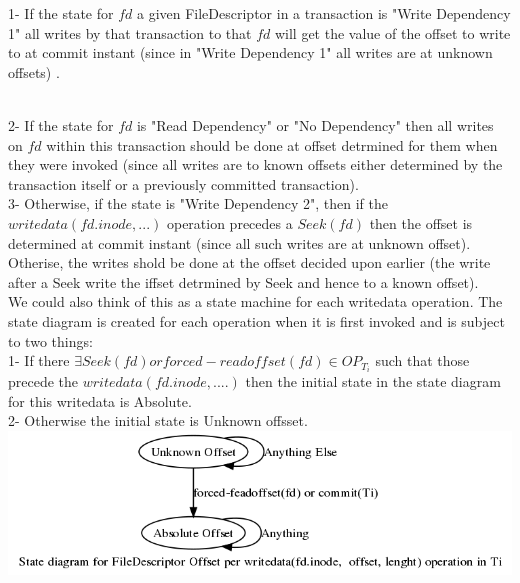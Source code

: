 \documentclass[a4paper, 11pt]{article}
\begin{document}
1- If the state for $fd$ a given FileDescriptor in a transaction is "Write Dependency 1" all writes by that transaction to that $fd$ will get the value of the offset to write to at commit instant (since in "Write Dependency 1" all writes are at unknown offsets) .\\\

2- If the state for $fd$ is "Read Dependency"  or "No Dependency" then all writes on $fd$ within this transaction should be done at offset detrmined for them when they were invoked (since all writes are to known offsets either determined by the transaction itself or a previously committed transaction).\\

3- Otherwise, if the state is "Write Dependency 2", then if the $writedata(fd.inode,...)$ operation precedes a $Seek(fd)$ then the offset is determined at commit instant (since all such writes are at unknown offset). Otherise, the writes shold be done at the offset decided upon earlier (the write after a Seek write the iffset detrmined by Seek and hence to a known offset).\\


We could also think of this as a state machine for each writedata operation. The state diagram is created for each operation when it is first invoked and is subject to two things:\\

1- If there $\exists Seek(fd) or forced-readoffset(fd)\in OP_{T_i}$ such that those precede the $writedata(fd.inode,....)$ then the initial state in the state diagram for this writedata is Absolute.\\

2- Otherwise the initial state is Unknown offsset.\\

\includegraphics[scale = 0.3]{hello2.png}\\
\end{document}
